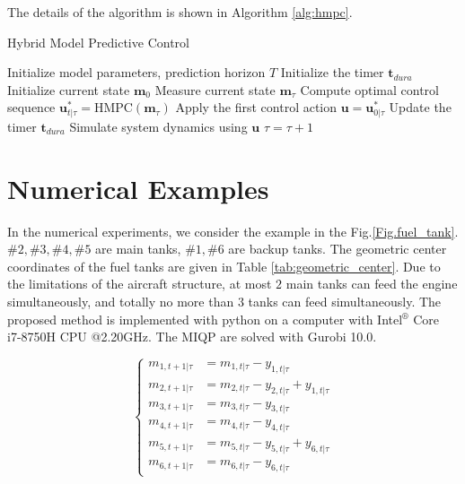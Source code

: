 \documentclass[english]{cccconf}
\begin{document}
The details of the algorithm is shown in Algorithm \ref{alg:hmpc}.

\begin{algorithm}
\caption{Hybrid Model Predictive Control}
\label{alg:hmpc}
\begin{algorithmic}[1]
\STATE Initialize model parameters, prediction horizon $T$
\STATE Initialize the timer $\mathbf{t}_{dura}$
\STATE Initialize current state $\mathbf{m}_0$
    \STATE Measure current state $\mathbf{m}_{\tau}$
    \STATE Compute optimal control sequence $\mathbf{u}_{t|\tau}^* = \text{HMPC}(\mathbf{m}_{\tau})$
    \STATE Apply the first control action $\mathbf{u} = \mathbf{u}_{0|\tau}^*$
    \STATE Update the timer $\mathbf{t}_{dura}$ 
    \STATE Simulate system dynamics using $\mathbf{u}$ 
    \STATE $\tau = \tau + 1$
\ENDWHILE
\end{algorithmic}
\end{algorithm}


\section{Numerical Examples}\label{sec:numerical_examples}
In the numerical experiments, we consider the example in the Fig.\ref{Fig.fuel_tank}. 
$\#2,\#3,\#4,\#5$ are main tanks, $\#1,\#6$ are backup tanks.
The geometric center coordinates of the fuel tanks are given in Table \ref{tab:geometric_center}. 
Due to the limitations of the aircraft structure, at most $2$ main tanks can feed the engine simultaneously,  and totally no more than $3$ tanks can feed simultaneously.
The proposed method is implemented with python on a computer with Intel$^\circledR$ Core\texttrademark ~ i7-8750H CPU @2.20GHz. 
The MIQP are solved with Gurobi 10.0.

\begin{equation}
\left\{
\begin{aligned}
m_{1,t+1|\tau} &= m_{1, t|\tau}-y_{1, t|\tau}\\
m_{2,t+1|\tau} &= m_{2, t|\tau} - y_{2, t|\tau} +y_{1, t|\tau}\\
m_{3,t+1|\tau} &= m_{3, t|\tau} - y_{3, t|\tau}\\
m_{4,t+1|\tau} &= m_{4, t|\tau} - y_{4, t|\tau}\\
m_{5,t+1|\tau} &= m_{5, t|\tau} - y_{5, t|\tau} +y_{6, t|\tau}\\
m_{6,t+1|\tau} &= m_{6, t|\tau} -y_{6, t|\tau}
\end{aligned}
\right.
\end{equation}
\end{document}
